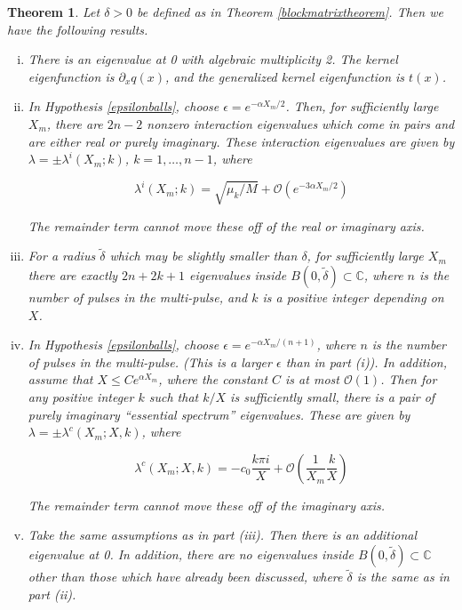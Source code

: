 \documentclass[12pt]{article}
\def\C{{\mathbb C}}
\newtheorem{theorem}{Theorem}
\begin{document}
\begin{theorem}
Let $\delta > 0$ be defined as in Theorem \ref{blockmatrixtheorem}. Then we have the following results.

\begin{enumerate}[(i)]

\item There is an eigenvalue at 0 with algebraic multiplicity 2. The kernel eigenfunction is $\partial_x q(x)$, and the generalized kernel eigenfunction is $t(x)$.

\item In Hypothesis \ref{epsilonballs}, choose $\epsilon = e^{-\alpha X_m/2}$.
Then, for sufficiently large $X_m$, there are $2n-2$ nonzero interaction eigenvalues which come in pairs and are either real or purely imaginary. These interaction eigenvalues are given by $\lambda = \pm \lambda^i(X_m; k)$, $k = 1, \dots, n-1$, where

\begin{equation}\label{inteigs}
\lambda^i(X_m; k) = \sqrt{\mu_k / M} + \mathcal{O}(e^{-3 \alpha X_m/2})
\end{equation}

The remainder term cannot move these off of the real or imaginary axis. 

\item For a radius $\tilde{\delta}$ which may be slightly smaller than $\delta$, for sufficiently large $X_m$ there are exactly $2n + 2k + 1$ eigenvalues inside $B(0, \tilde{\delta}) \subset \C$, where $n$ is the number of pulses in the multi-pulse, and $k$ is a positive integer depending on $X$.

\item In Hypothesis \ref{epsilonballs}, choose $\epsilon = e^{-\alpha X_m/(n+1)}$, where $n$ is the number of pulses in the multi-pulse. (This is a larger $\epsilon$ than in part (i)). In addition, assume that $X \leq C e^{\alpha X_m}$, where the constant $C$ is at most $\mathcal{O}(1)$. Then for any positive integer $k$ such that $k/X$ is sufficiently small, there is a pair of purely imaginary ``essential spectrum'' eigenvalues. These are given by $\lambda = \pm \lambda^c(X_m; X, k)$, where

\begin{equation}\label{essspeceigs}
\lambda^c(X_m; X, k) = -c_0 \frac{k \pi i}{X} + \mathcal{O}\left( \frac{1}{X_m} \frac{k}{X} \right)
\end{equation}

The remainder term cannot move these off of the imaginary axis.\\

\item Take the same assumptions as in part (iii). Then there is an additional eigenvalue at 0. In addition, there are no eigenvalues inside $B(0, \tilde{\delta}) \subset \C$ other than those which have already been discussed, where $\tilde{\delta}$ is the same as in part (ii).

\end{enumerate}

\end{theorem}
\end{document}
